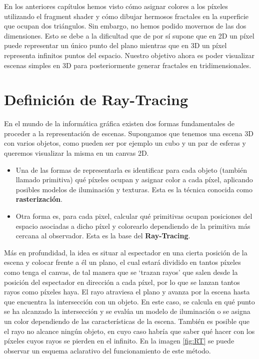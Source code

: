 %
%

En los anteriores capítulos hemos visto cómo asignar colores a los píxeles utilizando el fragment shader y cómo dibujar hermosos fractales en la superficie que ocupan dos triángulos. Sin embargo, no hemos podido movernos de las dos dimensiones. Esto se debe a la dificultad que de por sí supone que en 2D un píxel puede representar un único punto del plano mientras que en 3D un píxel representa infinitos puntos del espacio. Nuestro objetivo ahora es poder visualizar escenas simples en 3D para posteriormente generar fractales en tridimensionales.

\section{Definición de Ray-Tracing}

En el mundo de la informática gráfica existen dos formas fundamentales de proceder a la representación de escenas. Supongamos que tenemos una escena 3D con varios objetos, como pueden ser por ejemplo un cubo y un par de esferas y queremos visualizar la misma en un canvas 2D.
\begin{itemize}
    \item Una de las formas de representarla es identificar para cada objeto (también llamado primitiva) qué píxeles ocupan y asignar color a cada píxel, aplicando posibles modelos de iluminación y texturas. Esta es la técnica conocida como \textbf{rasterización}.
    \item Otra forma es, para cada pixel, calcular qué primitivas ocupan posiciones del espacio asociadas a dicho píxel y colorearlo dependiendo de la primitiva más cercana al observador. Esta es la base del \textbf{Ray-Tracing}.
\end{itemize}

Más en profundidad, la idea es situar al espectador en una cierta posición de la escena y colocar frente a él un plano, el cual estará dividido en tantos píxeles como tenga el canvas, de tal manera que se `trazan rayos' que salen desde la posición del espectador en dirección a cada píxel, por lo que se lanzan tantos rayos como píxeles haya. El rayo atraviesa el plano y avanza por la escena hasta que encuentra la intersección con un objeto. En este caso, se calcula en qué punto se ha alcanzado la intersección y se evalúa un modelo de iluminación o se asigna un color dependiendo de las características de la escena. También es posible que el rayo no alcance ningún objeto, en cuyo caso habría que saber qué hacer con los píxeles cuyos rayos se pierden en el infinito. En la imagen \ref{fig:RT} se puede observar un esquema aclarativo del funcionamiento de este método.

